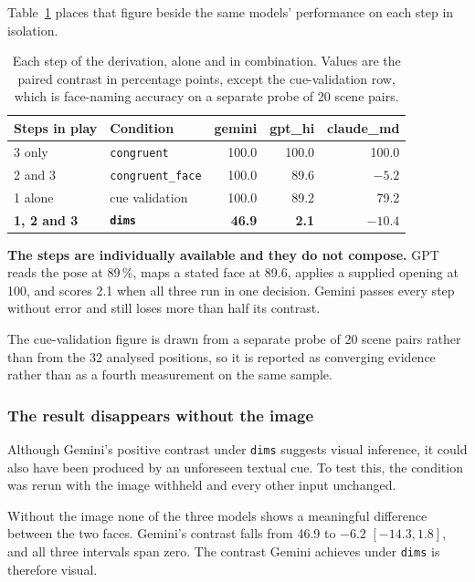 Table~\ref{tab:ex2-composition} places that figure beside the same models'
performance on each step in isolation.

\begin{table}[h]
\caption{Each step of the derivation, alone and in combination. Values are the
paired contrast in percentage points, except the cue-validation row, which is
face-naming accuracy on a separate probe of 20 scene pairs.}
\label{tab:ex2-composition}
\centering
\begin{tabular}{llrrr}
\toprule
Steps in play & Condition & gemini & gpt\_hi & claude\_md \\
\midrule
3 only            & \texttt{congruent}      & 100.0 & 100.0 & 100.0 \\
2 and 3           & \texttt{congruent\_face}& 100.0 &  89.6 & $-5.2$ \\
1 alone           & cue validation          & 100.0 &  89.2 &  79.2 \\
\midrule
\textbf{1, 2 and 3} & \textbf{\texttt{dims}} & \textbf{46.9} & \textbf{2.1}
  & \textbf{$-10.4$} \\
\bottomrule
\end{tabular}
\end{table}

\textbf{The steps are individually available and they do not compose.} GPT
reads the pose at 89\,\%, maps a stated face at 89.6, applies a supplied
opening at 100, and scores 2.1 when all three run in one decision. Gemini
passes every step without error and still loses more than half its contrast.

The cue-validation figure is drawn from a separate probe of 20 scene pairs
rather than from the 32 analysed positions, so it is reported as converging
evidence rather than as a fourth measurement on the same sample.

\subsubsection{The result disappears without the image}

Although Gemini's positive contrast under \texttt{dims} suggests visual
inference, it could also have been produced by an unforeseen textual cue. To
test this, the condition was rerun with the image withheld and every other
input unchanged.

Without the image none of the three models shows a meaningful difference
between the two faces. Gemini's contrast falls from 46.9 to $-6.2$
$[-14.3, 1.8]$, and all three intervals span zero. The contrast Gemini achieves
under \texttt{dims} is therefore visual.

